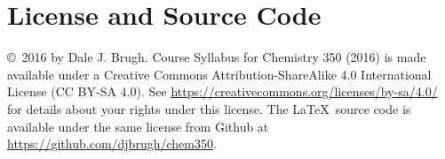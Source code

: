 \documentclass[letterpaper,oneside,onecolumn,11pt,article]{memoir}
\begin{document}
\section{License and Source Code}
\copyright\ 2016 by Dale J. Brugh. Course Syllabus for Chemistry 350 (2016) is made available under a Creative Commons Attribution-ShareAlike 4.0 International License (CC BY-SA 4.0). See \href{https://creativecommons.org/licenses/by-sa/4.0/}{https://creativecommons.org/licenses/by-sa/4.0/} for details about your rights under this license. The \LaTeX\ source code is available under the same license from Github at \href{https://github.com/djbrugh/chem350}{https://github.com/djbrugh/chem350}. 
%
%
\end{document}
